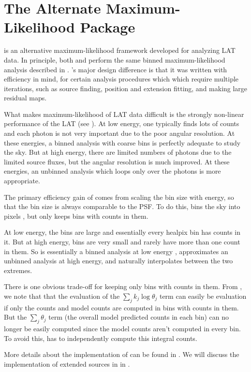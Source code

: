 \section{The Alternate Maximum-Likelihood Package \pointlike}

\pointlike is an alternative maximum-likelihood framework developed
for analyzing \ac{LAT} data. In principle, both \pointlike and \gtlike
perform the same binned maximum-likelihood analysis described in
. \pointlike's major design difference
is that it was written with efficiency in mind, for certain analysis
procedures which which require multiple iterations, such as source
finding, position and extension fitting, and making large residual
\ts maps.

What makes maximum-likelihood of \ac{LAT} data difficult
is the strongly non-linear performance of the \ac{LAT} (see
). At low energy, one typically finds lots
of counts and each photon is not very important due to the poor angular
resolution. At these energies, a binned analysis with coarse bins is
perfectly adequate to study the sky.  But at high energy, there are
limited numbers of photons due to the limited source fluxes, but the
angular resolution is much improved.  At these energies, an unbinned
analysis which loops only over the photons is more appropriate.

The primary efficiency gain of \pointlike comes from scaling the bin
size with energy, so that the bin size is always comparable to the
\ac{PSF}.  To do this, \pointlike bins the sky into \healpix pixels
\citep{gorski_2005_healpix:-framework}, but only keeps bins with counts
in them.

At low energy, the bins are large and essentially every healpix bin
has counts in it.  But at high energy, bins are very small and rarely
have more than one count in them.  So \pointlike is essentially a binned
analysis at low energy , approximates an unbinned analysis at high energy,
and naturally interpolates between the two extremes.

There is one obvious trade-off for keeping only bins with counts in them.
From , we note that that the evaluation
of the $\sum_j k_j\log\theta_j$ term can easily be evaluation if only
the counts and model counts are computed in bins with counts in them.
But the $\sum_j \theta_j$ term (the overall model predicted counts in
each bin) can no longer be easily computed since the model counts aren't
computed in every bin. To avoid this, \pointlike has to independently
compute this integral counts.

More details about the implementation of \pointlike can be found in
\cite{kerr_2010a_likelihood-methods}. We will discuss the implementation
of extended sources in \pointlike in .

